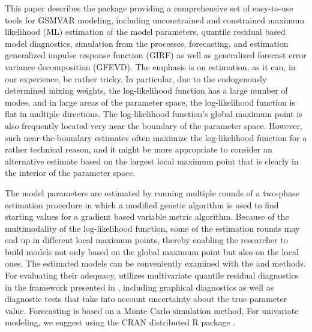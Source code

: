 \documentclass[nojss]{jss} %
\begin{document}
This paper describes the  package  providing a comprehensive set of easy-to-use tools for GSMVAR modeling, including unconstrained and constrained maximum likelihood (ML) estimation of the model parameters, quantile residual based model diagnostics, simulation from the processes, forecasting, and estimation generalized impulse response function (GIRF) as well as generalized forecast error variance decomposition (GFEVD). The emphasis is on estimation, as it can, in our experience, be rather tricky. In particular, due to the endogenously determined mixing weights, the log-likelihood function has a large number of modes, and in large areas of the parameter space, the log-likelihood function is flat in multiple directions. The log-likelihood function's global maximum point is also frequently located very near the boundary of the parameter space. However, such near-the-boundary estimates often maximize the log-likelihood function for a rather technical reason, and it might be more appropriate to consider an alternative estimate based on the largest local maximum point that is clearly in the interior of the parameter space.

The model parameters are estimated by running multiple rounds of a two-phase estimation procedure in which a modified genetic algorithm is used to find starting values for a gradient based variable metric algorithm. Because of the multimodality of the log-likelihood function, some of the estimation rounds may end up in different local maximum points, thereby enabling the researcher to build models not only based on the global maximum point but also on the local ones. The estimated models can be conveniently examined with the  and  methods. For evaluating their adequacy,  utilizes multivariate quantile residual diagnostics in the framework presented in \cite{Kalliovirta+Saikkonen:2010}, including graphical diagnostics as well as diagnostic tests that take into account uncertainty about the true parameter value. Forecasting is based on a Monte Carlo simulation method. For univariate modeling, we suggest using the CRAN distributed R package  \citep{uGMAR}.
\end{document}
